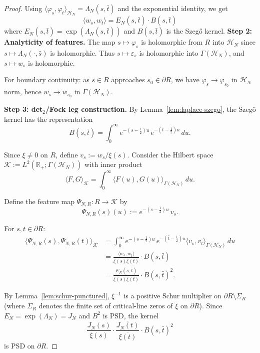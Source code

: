 \documentclass[11pt]{article}
\theoremstyle{remark}
\begin{document}
\begin{proof}
Using $\langle \varphi_s, \varphi_t \rangle_{\mathcal{H}_N} = \Lambda_N(s,\bar t)$ and the exponential identity, we get
\[
  \langle w_s, w_t \rangle = E_N(s,\bar t) \cdot B(s,\bar t)
\]
where $E_N(s,\bar t) = \exp(\Lambda_N(s,\bar t))$ and $B(s,\bar t)$ is the Szegő kernel.
\medskip
\noindent\textbf{Step 2: Analyticity of features.}
The map $s \mapsto \varphi_s$ is holomorphic from $R$ into $\mathcal{H}_N$ since $s \mapsto \Lambda_N(\cdot, \bar s)$ is holomorphic. Thus $s \mapsto \varepsilon_s$ is holomorphic into $\Gamma(\mathcal{H}_N)$, and $s \mapsto w_s$ is holomorphic.

For boundary continuity: as $s \in R$ approaches $s_0 \in \partial R$, we have $\varphi_s \to \varphi_{s_0}$ in $\mathcal{H}_N$ norm, hence $w_s \to w_{s_0}$ in $\Gamma(\mathcal{H}_N)$.

\medskip
\noindent\textbf{Step 3: det$_2$/Fock leg construction.}
By Lemma~\ref{lem:laplace-szego}, the Szegő kernel has the representation
\[
  B(s,\bar t) = \int_0^\infty e^{-(s-\frac{1}{2})u} \, e^{-(\bar t - \frac{1}{2})u} \, du.
\]

Since $\xi \neq 0$ on $R$, define $v_s := w_s / \xi(s)$. Consider the Hilbert space $\mathcal{K} := L^2(\mathbb{R}_+; \Gamma(\mathcal{H}_N))$ with inner product
\[
  \langle F, G \rangle_{\mathcal{K}} = \int_0^\infty \langle F(u), G(u) \rangle_{\Gamma(\mathcal{H}_N)} \, du.
\]

Define the feature map $\Psi_{N,R}: R \to \mathcal{K}$ by
\[
  \Psi_{N,R}(s)(u) := e^{-(s-\frac{1}{2})u} \, v_s.
\]

For $s,t \in \partial R$:
\begin{align}
  \langle \Psi_{N,R}(s), \Psi_{N,R}(t) \rangle_{\mathcal{K}} 
  &= \int_0^\infty e^{-(s-\frac{1}{2})u} \, e^{-(\bar t - \frac{1}{2})u} \langle v_s, v_t \rangle_{\Gamma(\mathcal{H}_N)} \, du\\
  &= \frac{\langle w_s, w_t \rangle}{\xi(s)\overline{\xi(t)}} \cdot B(s,\bar t)\\
  &= \frac{E_N(s,\bar t)}{\xi(s)\overline{\xi(t)}} \cdot B(s,\bar t)^2.
\end{align}

By Lemma~\ref{lem:schur-punctured}, \(\xi^{-1}\) is a positive Schur multiplier on \(\partial R \setminus \Sigma_R\) (where \(\Sigma_R\) denotes the finite set of critical-line zeros of \(\xi\) on \(\partial R\)). Since \(E_N = \exp(\Lambda_N) = J_N\) and \(B^2\) is PSD, the kernel
\[
  \frac{J_N(s)}{\xi(s)} \cdot \frac{\overline{J_N(t)}}{\overline{\xi(t)}} \cdot B(s,\bar t)^2
\]
is PSD on \(\partial R\).


\end{proof}
\end{document}
